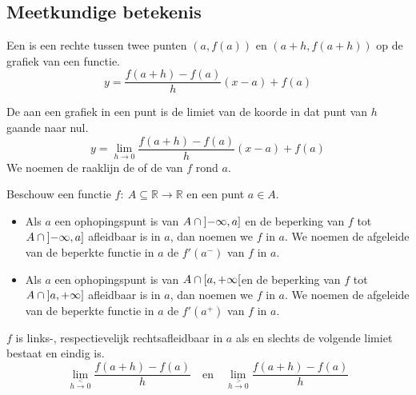 \documentclass[main.tex]{subfiles}
\begin{document}
\subsection{Meetkundige betekenis}
\label{sec:meetk-betek}

\begin{de}
  Een  is een rechte tussen twee punten $(a,f(a))$ en $(a+h,f(a+h))$ op de grafiek van een functie.
  \[ y = \frac{f(a+h) -f(a)}{h} (x-a) + f(a) \]
\end{de}

\begin{de}
  De  aan een grafiek in een punt is de limiet van de koorde in dat punt van $h$ gaande naar nul.
  \[ y = \lim_{h\rightarrow 0}\frac{f(a+h) -f(a)}{h} (x-a) + f(a) \]
  We noemen de raaklijn de  of de  van $f$ rond $a$.
\end{de}

\begin{de}
  Beschouw een functie $f:\ A \subseteq \mathbb{R} \rightarrow \mathbb{R}$ en een punt $a \in A$.
  \begin{itemize}
  \item Als $a$ een ophopingspunt is van $A \cap \interval[open left]{-\infty}{a}$ en de beperking van $f$ tot $A \cap \interval[open left]{-\infty}{a}$ afleidbaar is in $a$, dan noemen we $f$  in $a$.
    We noemen de afgeleide van de beperkte functie in $a$ de  $f'(a^{-})$ van $f$ in $a$.
  \item Als $a$ een ophopingspunt is van $A \cap \interval[open right]{a}{+\infty}$en de beperking van $f$ tot $A \cap \interval[open left]{a}{+\infty}$ afleidbaar is in $a$, dan noemen we $f$  in $a$.
    We noemen de afgeleide van de beperkte functie in $a$ de  $f'(a^{+})$ van $f$ in $a$.
  \end{itemize}
\end{de}

\begin{st}
  $f$ is links-, respectievelijk rechtsafleidbaar in $a$ als en slechts de volgende limiet bestaat en eindig is.
  \[ \lim_{h\overset{<}{\rightarrow} 0}\frac{f(a+h)-f(a)}{h} \quad\text{en}\quad \lim_{h\overset{>}{\rightarrow} 0}\frac{f(a+h)-f(a)}{h} \]
\end{st}
\end{document}
